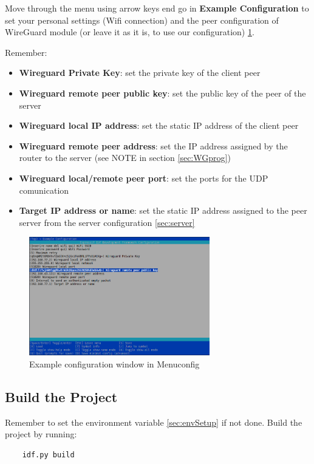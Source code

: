 Move through the menu using arrow keys end go in \textbf{Example Configuration} to set your personal settings (Wifi connection)
and the peer configuration of WireGuard module (or leave it as it is, to use our configuration) \ref{fig:menuConfig_ex}.

Remember:
\begin{itemize}
    \item \textbf{Wireguard Private Key}: set the private key of the client peer
    \item \textbf{Wireguard remote peer public key}: set the public key of the peer of the server
    \item \textbf{Wireguard local IP address}: set the static IP address of the client peer
    \item \textbf{Wireguard remote peer address}: set the IP address assigned by the router to the server (see NOTE in section \ref{sec:WGprog})
    \item \textbf{Wireguard local/remote peer port}: set the ports for the UDP comunication
    \item \textbf{Target IP address or name}: set the static IP address assigned to the peer server from the server configuration \ref{sec:server}
\end{itemize}

\begin{figure}[H]
    \vspace{0.4cm}
    \centering
    \includegraphics[width=0.7\textwidth]{images/menuConfig_ex.png}
    \caption{Example configuration window in Menuconfig}
    \label{fig:menuConfig_ex} %
\end{figure}

\subsection{Build the Project}
Remember to set the environment variable \ref{sec:envSetup} if not done.
Build the project by running:
\begin{lstlisting}
    idf.py build
\end{lstlisting}

